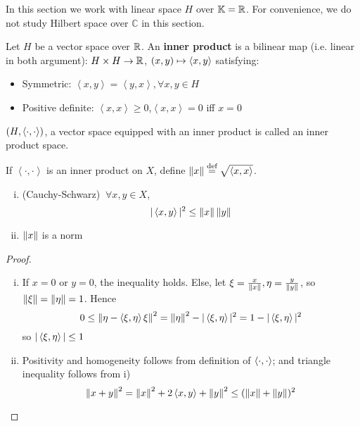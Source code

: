 \documentclass{article}
\begin{document}
In this section we work with linear space $H$ over $\mathbb{K} = \mathbb{R}$. For convenience, we do not study Hilbert space over $\mathbb{ C}$ in this section.


\begin{definition}
	Let $H$ be a vector space over $\mathbb{R}$. An {\bf inner product} is a bilinear map (i.e. linear in both argument):
	$H\times H\to\mathbb{R}$, $(x,y)\mapsto \left<{x},{y}\right>$ satisfying:
	\begin{itemize}
		\item Symmetric: $\left<x,y\right>={{\left<y,x\right>}},\forall x,y\in H$
		\item Positive definite: $\left<x,x\right>\geq0$,$\left<x,x\right>=0$ iff $x=0$
	\end{itemize}  
\end{definition}

\begin{definition}
    $(H,\left<{\cdot},{\cdot}\right>)$, a vector space equipped with an inner product is called an inner product space.
\end{definition}



\begin{theorem}
	If $\left<\cdot,\cdot\right>$ is an inner product on $X$, define $\left\|{x}\right\|\overset{\textrm{def}}{=}\sqrt{\left<{x},{x}\right>}$.
	\begin{enumerate}[i)]
		\item (Cauchy-Schwarz) $\ \forall x,y\in X$,
		      $$|\left<{x},{y}\right>|^2\leq \left\|{x}\right\| \left\|{y}\right\|$$
		\item $\left\|{x}\right\|$ is a norm
	\end{enumerate}
\end{theorem}

\begin{proof}
	\begin{enumerate}[i)]
		\item If $x=0$ or $y=0$, the inequality holds. Else, let $\xi = \frac{x}{\left\|{x}\right\|}, \eta = \frac{y}{\left\|{y}\right\|}$, so $\left\|{\xi}\right\|=\left\|{\eta}\right\|=1$. Hence
		      $$0 \leq \left\|{\eta-\left<{\xi},{\eta}\right>\xi}\right\|^2=\left\|{\eta}\right\|^2 - |\left<{\xi},{\eta}\right>|^2=1-|\left<{\xi},{\eta}\right>|^2$$
		      so $|\left<{\xi},{\eta}\right>| \leq 1$
		\item Positivity and homogeneity follows from definition of $\left<{\cdot},{\cdot}\right>$; and triangle inequality follows from i)
		      $$
			      \left\|{x+y}\right\|^2=\left\|{x}\right\|^2 + 2 \left<{x},{y}\right> + \left\|{y}\right\|^2 \leq (\left\|{x}\right\|+\left\|{y}\right\|)^2
		      $$
	\end{enumerate}
\end{proof}
\end{document}
